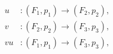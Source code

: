 \begin{equation}
  \begin{aligned}
    u&\colon(F_1,p_1)\longrightarrow(F_2,p_2),\\
    v&\colon(F_2,p_2)\longrightarrow(F_3,p_3),\\
    vu&\colon(F_1,p_1)\longrightarrow(F_3,p_3),
  \end{aligned}
  \tag{1.4.7.2}
\end{equation}

